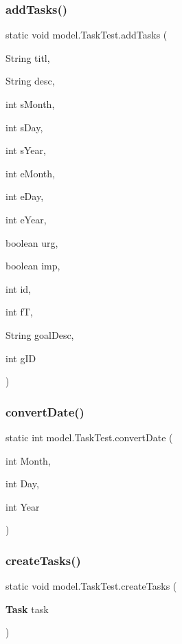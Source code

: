 \subsubsection{add\+Tasks()}
{\footnotesize\ttfamily static void model.\+Task\+Test.\+add\+Tasks (\begin{DoxyParamCaption}\item[{String}]{titl,  }\item[{String}]{desc,  }\item[{int}]{s\+Month,  }\item[{int}]{s\+Day,  }\item[{int}]{s\+Year,  }\item[{int}]{e\+Month,  }\item[{int}]{e\+Day,  }\item[{int}]{e\+Year,  }\item[{boolean}]{urg,  }\item[{boolean}]{imp,  }\item[{int}]{id,  }\item[{int}]{fT,  }\item[{String}]{goal\+Desc,  }\item[{int}]{g\+ID }\end{DoxyParamCaption})\hspace{0.3cm}{\ttfamily [static]}}

\mbox{\label{classmodel_1_1_task_test_a615ada1472fab393a8d3292b1f52388a}} 
\subsubsection{convert\+Date()}
{\footnotesize\ttfamily static int model.\+Task\+Test.\+convert\+Date (\begin{DoxyParamCaption}\item[{int}]{Month,  }\item[{int}]{Day,  }\item[{int}]{Year }\end{DoxyParamCaption})\hspace{0.3cm}{\ttfamily [static]}}

\mbox{\label{classmodel_1_1_task_test_a2941134f43a219c62a3e00745df65e18}} 
\subsubsection{create\+Tasks()}
{\footnotesize\ttfamily static void model.\+Task\+Test.\+create\+Tasks (\begin{DoxyParamCaption}\item[{\textbf{ Task}}]{task }\end{DoxyParamCaption})\hspace{0.3cm}{\ttfamily [static]}}

